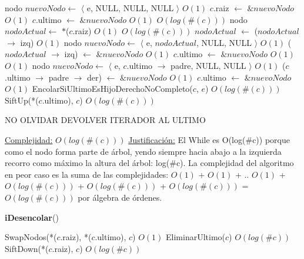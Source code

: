 \begin{Algoritmos}
\begin{algorithmic}[1]
        \State nodo $nuevoNodo \gets$ $\langle$ e, NULL, NULL, NULL $\rangle$   \Comment $O(1)$
        \State $c$.raiz $\gets$ $\& nuevoNodo$ \Comment $O(1)$
        \State $c$.ultimo $\gets$ $\& nuevoNodo$ \Comment $O(1)$
    \Else
          \Comment $O(log(\#(c)))$
            \State nodo $nodoActual \gets$ $*$($c$.raiz) \Comment $O(1)$
              \Comment $O(log(\#(c)))$
                \State $nodoActual$ $\gets$ ($nodoActual$ $\to$ izq)  \Comment $O(1)$
            \EndWhile
            \State nodo $nuevoNodo \gets$ $\langle$ e, $nodoActual$, NULL, NULL $\rangle$   \Comment $O(1)$
            \State ($nodoActual$ $\to$ izq) $\gets$ $\& nuevoNodo$ \Comment $O(1)$
            \State $c$.ultimo $\gets$ $\& nuevoNodo$ \Comment $O(1)$
        \Else
              \Comment $O(1)$
                \State nodo $nuevoNodo \gets$ $\langle$ e, $c$.ultimo $\to$ padre, NULL, NULL $\rangle$   \Comment $O(1)$
                \State ($c$.ultimo $\to$ padre $\to$ der) $\gets$ $\& nuevoNodo$ \Comment $O(1)$
                \State $c$.ultimo $\gets$ $\& nuevoNodo$ \Comment $O(1)$
            \Else %
                \State EncolarSiUltimoEsHijoDerechoNoCompleto($c$, $e$) \Comment $O(log(\#(c)))$
            \EndIf
        \EndIf
    \EndIf
    \State $ $
    \State SiftUp(*($c$.ultimo), $c$) \Comment $O(log(\#(c)))$

    NO OLVIDAR DEVOLVER ITERADOR AL ULTIMO

    \medskip
    \Statex \underline{Complejidad:} $O(log(\#(c)))$
    \Statex \underline{Justificaci\'on:} El While es O(log($\#$c)) porque como el nodo forma parte de \'arbol, yendo siempre hacia abajo a la izquierda recorro como m\'aximo la altura del \'arbol: log($\#$c). La complejidad del algoritmo en peor caso es la suma de las complejidades: $O(1)$ + $O(1)$ + .. $O(1)$ + $O(log(\#(c)))$ + $O(log(\#(c)))$ + $O(log(\#(c)))$ = $O(log(\#(c)))$ por \'algebra de \'ordenes.
\end{algorithmic}


\begin{algorithm}[H]
{\textbf{iDesencolar}()}
\begin{algorithmic}[1]
    
    \State SwapNodos(*($c$.raiz), *($c$.ultimo), $c$) \Comment $O(1)$
    \State EliminarUltimo($c$) \Comment $O(log(\#c))$
    \State SiftDown(*($c$.raiz), $c$) \Comment $O(log(\#c))$
    

\end{algorithmic}
\end{algorithm}
\end{Algoritmos}
